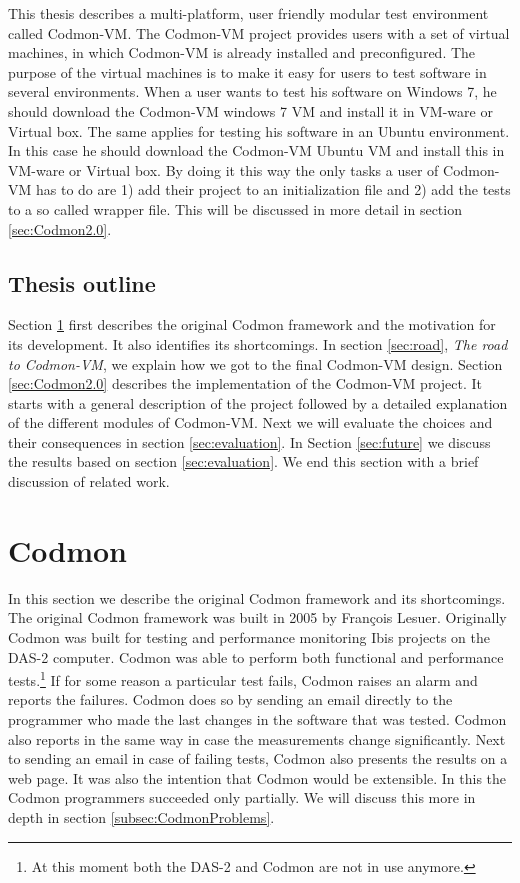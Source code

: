 \documentclass{article}
\newcommand{\project}{Codmon-VM}
\begin{document}
\noindent This thesis describes a multi-platform, user friendly modular test environment called \project{}. The \project{} project provides users with a set of virtual machines,
in which \project{} is already installed and preconfigured. The purpose of the virtual machines is to make it easy for users to test software in several environments.  When a user wants to 
test his software on Windows 7, he should download the \project{} windows 7 VM and install it in VM-ware or Virtual box. The same applies for testing his software in an Ubuntu environment. In this case he should 
download the \project{} Ubuntu VM and install this in VM-ware or Virtual box. By doing it this way the  only tasks a user of \project{} has to do are 1) add their project to an initialization file and 2) add 
the tests to a so called wrapper file. This will be discussed in more detail in section \ref{sec:Codmon2.0}.


\subsection{Thesis outline}
\label{subsec:Thesisoutline}
Section \ref{sec:codmon} first describes the original Codmon framework and the motivation for its development. It also identifies its shortcomings. In section \ref{sec:road}, \emph{The road to \project{}}, 
we explain how we got to the final \project{} design. Section \ref{sec:Codmon2.0} describes the implementation of the \project{} project. 
It starts with a general description of the project followed by a detailed explanation of the different modules of \project{}. Next we will evaluate the choices and their consequences 
in section \ref{sec:evaluation}. In Section \ref{sec:future} we discuss the results based on section \ref{sec:evaluation}. We end this section with a brief discussion of related work.

\newpage
\section{Codmon}
\label{sec:codmon}
In this section we describe the original Codmon framework and its shortcomings. The original Codmon framework was built in 2005 by François Lesuer\cite{Codmon}. Originally Codmon was built for 
testing and performance monitoring Ibis projects\cite{Ibis,Satin,MPJ,IPL,GMI} on the DAS-2\cite{das2} computer. Codmon was able to perform both functional and performance tests.\footnote{At 
this moment both the DAS-2 and Codmon are not in use anymore.} If for some reason a particular test fails, Codmon raises an alarm and reports the failures. Codmon does so by 
sending an email directly to the programmer who made the last changes in the software that was tested. Codmon also reports in the same way in case the measurements change significantly. 
Next to sending an email in case of failing tests, Codmon also presents the results on a web page. It was also the intention that Codmon would be extensible. In this the Codmon programmers 
succeeded only partially. We will discuss this more in depth in section \ref{subsec:CodmonProblems}.  
\end{document}

